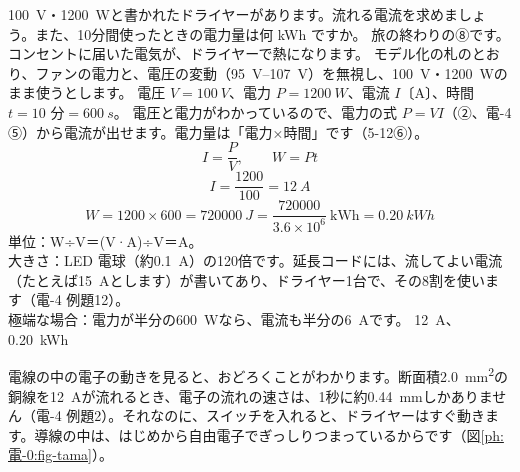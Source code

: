 \begin{phreidai}[ドライヤーに流れる電流]\label{ph:電-0:ex1}
\qty{100}{V}・\qty{1200}{W}と書かれたドライヤーがあります。流れる電流を求めましょう。また、10分間使ったときの電力量は何 kWh ですか。
\phbamen
旅の終わりの⑧です。コンセントに届いた電気が、ドライヤーで熱になります。
\phmushi
モデル化の札のとおり、ファンの電力と、電圧の変動（\qtyrange{95}{107}{V}）を無視し、\qty{100}{V}・\qty{1200}{W}のまま使うとします。
\phzu
電圧 $V=\qty{100}{V}$、電力 $P=\qty{1200}{W}$、電流 $I$〔A〕、時間 $t=10$ 分$=\qty{600}{s}$。
\phriyu
電圧と電力がわかっているので、電力の式 $P=VI$（②、電-4 ⑤）から電流が出せます。電力量は「電力×時間」です（5-12⑥）。
\phtateru
\[I=\frac{P}{V},\qquad W=Pt\]
\phtoku
\[I=\frac{1200}{100}=\qty{12}{A}\]
\[W=1200\times600=\qty{720000}{J}=\frac{\num{720000}}{3.6\times10^6}\ \text{kWh}=\qty{0.20}{kWh}\]
\phtashikame
単位：W÷V＝(V·A)÷V＝A。\\
大きさ：LED 電球（約\qty{0.1}{A}）の120倍です。延長コードには、流してよい電流（たとえば\qty{15}{A}とします）が書いてあり、ドライヤー1台で、その8割を使います（電-4 例題12）。\\
極端な場合：電力が半分の\qty{600}{W}なら、電流も半分の\qty{6}{A}です。
\kotae \qty{12}{A}、\qty{0.20}{kWh}
\end{phreidai}
\noindent 電線の中の電子の動きを見ると、おどろくことがわかります。断面積\qty{2.0}{mm^2}の銅線を\qty{12}{A}が流れるとき、電子の流れの速さは、1秒に約\qty{0.44}{mm}しかありません（電-4 例題2）。それなのに、スイッチを入れると、ドライヤーはすぐ動きます。導線の中は、はじめから自由電子でぎっしりつまっているからです（図\ref{ph:電-0:fig-tama}）。
\begin{bkfigure}
\label{ph:電-0:fig-tama}
\end{bkfigure}

